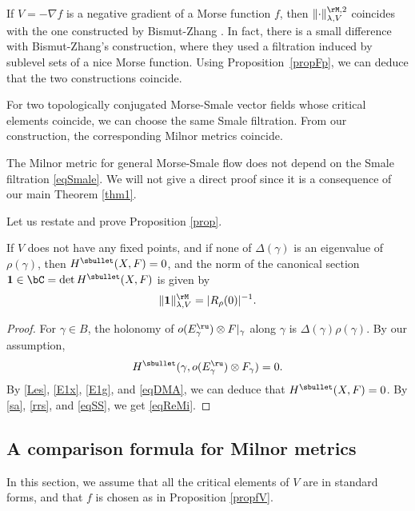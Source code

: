 \begin{re}
If $V=-\nabla f$ is a negative gradient of a Morse function $f$, then
$\|{\cdot}\|^{\rM,2}_{\lambda,V}$ coincides with the one constructed by
Bismut-Zhang \cite[Def.\,1.9]{BZ92}.
In fact, there is a small difference with Bismut-Zhang's
construction, where they used a filtration \cite[(1.37)]{BZ92} induced
by sublevel sets of a nice Morse function. Using Proposition~\ref{propFp}, we can deduce that the two constructions coincide.
\end{re}

\begin{re}\label{reDMA}
For two topologically conjugated Morse-Smale vector fields whose
critical elements coincide, we can choose the same Smale filtration. From our construction, the corresponding Milnor metrics coincide.
\end{re}

\begin{re}
The Milnor metric for
general Morse-Smale flow does not depend on the Smale
filtration \eqref{eqSmale}. We will not give a direct proof since it is a consequence of our main Theorem \ref{thm1}.
\end{re}

Let us restate and prove Proposition \ref{prop}.

\begin{prop}\label{Prop}
If $V$ does not have any fixed points, and
if none of $\Delta(\gamma)$ is an eigenvalue of $\rho(\gamma)$, then
$H^{\sbullet}(X,F)=0$, and the norm of the canonical section
$\mathbf{1}\in \bC=\det H^{\sbullet}(X,F)$ is given by
\begin{equation}\label{eqReMi}
\|\mathbf{1}\|^{\rM}_{\lambda,V}=|R_{\rho}(0)|^{-1}.
\end{equation}
\end{prop}
\begin{proof}
For $\gamma\in B$, the holonomy of $o(E_{\gamma}^{\ru})\otimes
F|_{\gamma}$
along $\gamma$ is $\Delta(\gamma)\rho(\gamma)$. By our
assumption,
\begin{equation}\label{eqDMA}
H^{\sbullet}(\gamma,o(E_{\gamma}^{\ru})\otimes
F_{\gamma})=0.
\end{equation}
By \eqref{Les}, \eqref{E1x}, \eqref{E1g}, and \eqref{eqDMA}, we can deduce that $H^{\sbullet}(X,F)=0$. By
\eqref{sa}, \eqref{rrs}, and \eqref{eqSS}, we get
\eqref{eqReMi}.
\end{proof}

\subsection{A comparison formula for Milnor metrics}\label{sCMM}
In this section, we assume that all the critical elements of
$V$ are in standard forms, and that $f$ is chosen as in
Proposition \ref{propfV}.

